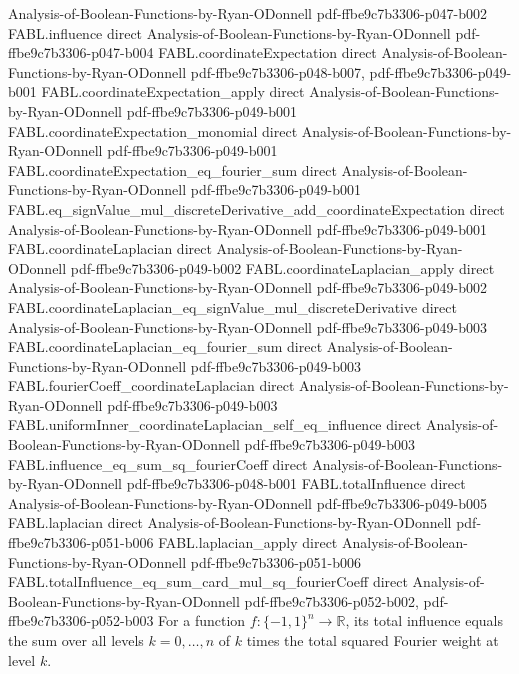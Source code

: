 \begin{theorem}
  {Analysis-of-Boolean-Functions-by-Ryan-ODonnell}
  {pdf-ffbe9c7b3306-p047-b002}
\proofstep
  {FABL.influence}
  {direct}
  {Analysis-of-Boolean-Functions-by-Ryan-ODonnell}
  {pdf-ffbe9c7b3306-p047-b004}
\proofstep
  {FABL.coordinateExpectation}
  {direct}
  {Analysis-of-Boolean-Functions-by-Ryan-ODonnell}
  {pdf-ffbe9c7b3306-p048-b007,
    pdf-ffbe9c7b3306-p049-b001}
\proofstep
  {FABL.coordinateExpectation_apply}
  {direct}
  {Analysis-of-Boolean-Functions-by-Ryan-ODonnell}
  {pdf-ffbe9c7b3306-p049-b001}
\proofstep
  {FABL.coordinateExpectation_monomial}
  {direct}
  {Analysis-of-Boolean-Functions-by-Ryan-ODonnell}
  {pdf-ffbe9c7b3306-p049-b001}
\proofstep
  {FABL.coordinateExpectation_eq_fourier_sum}
  {direct}
  {Analysis-of-Boolean-Functions-by-Ryan-ODonnell}
  {pdf-ffbe9c7b3306-p049-b001}
\proofstep
  {FABL.eq_signValue_mul_discreteDerivative_add_coordinateExpectation}
  {direct}
  {Analysis-of-Boolean-Functions-by-Ryan-ODonnell}
  {pdf-ffbe9c7b3306-p049-b001}
\proofstep
  {FABL.coordinateLaplacian}
  {direct}
  {Analysis-of-Boolean-Functions-by-Ryan-ODonnell}
  {pdf-ffbe9c7b3306-p049-b002}
\proofstep
  {FABL.coordinateLaplacian_apply}
  {direct}
  {Analysis-of-Boolean-Functions-by-Ryan-ODonnell}
  {pdf-ffbe9c7b3306-p049-b002}
\proofstep
  {FABL.coordinateLaplacian_eq_signValue_mul_discreteDerivative}
  {direct}
  {Analysis-of-Boolean-Functions-by-Ryan-ODonnell}
  {pdf-ffbe9c7b3306-p049-b003}
\proofstep
  {FABL.coordinateLaplacian_eq_fourier_sum}
  {direct}
  {Analysis-of-Boolean-Functions-by-Ryan-ODonnell}
  {pdf-ffbe9c7b3306-p049-b003}
\proofstep
  {FABL.fourierCoeff_coordinateLaplacian}
  {direct}
  {Analysis-of-Boolean-Functions-by-Ryan-ODonnell}
  {pdf-ffbe9c7b3306-p049-b003}
\proofstep
  {FABL.uniformInner_coordinateLaplacian_self_eq_influence}
  {direct}
  {Analysis-of-Boolean-Functions-by-Ryan-ODonnell}
  {pdf-ffbe9c7b3306-p049-b003}
\proofstep
  {FABL.influence_eq_sum_sq_fourierCoeff}
  {direct}
  {Analysis-of-Boolean-Functions-by-Ryan-ODonnell}
  {pdf-ffbe9c7b3306-p048-b001}
\proofstep
  {FABL.totalInfluence}
  {direct}
  {Analysis-of-Boolean-Functions-by-Ryan-ODonnell}
  {pdf-ffbe9c7b3306-p049-b005}
\proofstep
  {FABL.laplacian}
  {direct}
  {Analysis-of-Boolean-Functions-by-Ryan-ODonnell}
  {pdf-ffbe9c7b3306-p051-b006}
\proofstep
  {FABL.laplacian_apply}
  {direct}
  {Analysis-of-Boolean-Functions-by-Ryan-ODonnell}
  {pdf-ffbe9c7b3306-p051-b006}
\proofstep
  {FABL.totalInfluence_eq_sum_card_mul_sq_fourierCoeff}
  {direct}
  {Analysis-of-Boolean-Functions-by-Ryan-ODonnell}
  {pdf-ffbe9c7b3306-p052-b002,
    pdf-ffbe9c7b3306-p052-b003}
For a function $f:\{-1,1\}^n\to\mathbb R$, its total influence equals the sum over all
levels $k=0,\ldots,n$ of $k$ times the total squared Fourier weight at level $k$.
\end{theorem}

